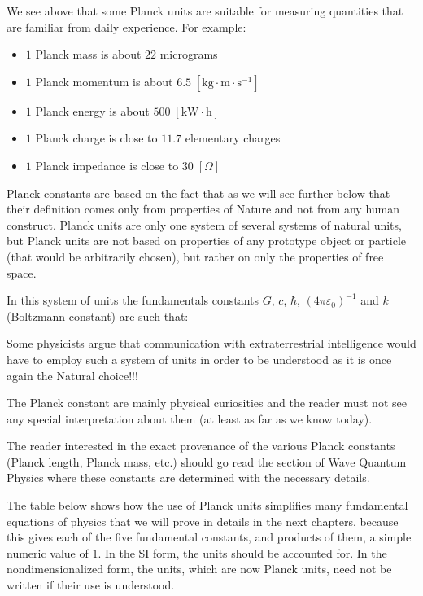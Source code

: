 	We see above that some Planck units are suitable for measuring quantities that are familiar from daily experience. For example:
	\begin{itemize}
		\item $1$ Planck mass is about $22$ micrograms
		\item $1$ Planck momentum is about $6.5\;[\text{kg}\cdot\text{m}\cdot\text{s}^{-1}]$
		\item $1$ Planck energy is about $500\; [\text{kW}\cdot \text{h}]$
		\item $1$ Planck charge is close to $11.7$ elementary charges
		\item $1$ Planck impedance is close to $30\;[\Omega]$
	\end{itemize}

	Planck constants are based on the fact that as we will see further below that their definition comes only from properties of Nature and not from any human construct. Planck units are only one system of several systems of natural units, but Planck units are not based on properties of any prototype object or particle (that would be arbitrarily chosen), but rather on only the properties of free space.

	In this system of units the fundamentals constants $G$, $c$, $\hbar$, $(4\pi\varepsilon_0)^{-1}$ and $k$ (Boltzmann constant) are such that:
	
	Some physicists argue that communication with extraterrestrial intelligence would have to employ such a system of units in order to be understood as it is once again the Natural choice!!!
	
	The Planck constant are mainly physical curiosities and the reader must not see any special interpretation about them (at least as far as we know today).
	
	\begin{tcolorbox}[title=Remark,colframe=black,arc=10pt]
	The reader interested in the exact provenance of the various Planck constants  (Planck length, Planck mass, etc.) should go read the section of Wave Quantum Physics where these constants are determined with the necessary details.
	\end{tcolorbox}
	The table below shows how the use of Planck units simplifies many fundamental equations of physics that we will prove in details in the next chapters, because this gives each of the five fundamental constants, and products of them, a simple numeric value of $1$. In the SI form, the units should be accounted for. In the nondimensionalized form, the units, which are now Planck units, need not be written if their use is understood.
	
